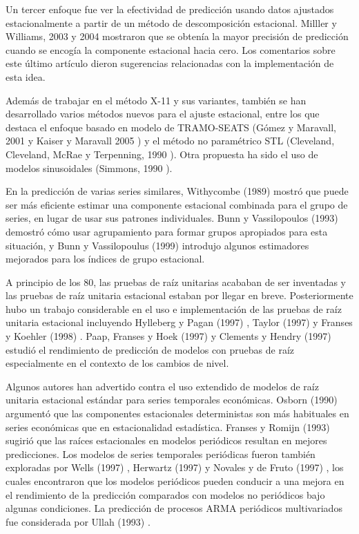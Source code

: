 \documentclass{llncs}
\begin{document}
Un tercer enfoque fue ver la efectividad de predicción usando datos ajustados estacionalmente a partir de un método de descomposición estacional. Milller y Williams, 2003 \cite{Miller2003669} y 2004 \cite{Miller2004529} mostraron que se obtenía la mayor precisión de predicción cuando se encogía la componente estacional hacia cero.  Los comentarios sobre este último artículo dieron sugerencias relacionadas con la implementación de esta idea.

Además de trabajar en el método X-11 y sus variantes, también se han desarrollado varios métodos nuevos para el ajuste estacional, entre los que destaca el enfoque basado en modelo de TRAMO-SEATS (Gómez y Maravall, 2001 \cite{Gómez2001} y Kaiser y Maravall 2005 \cite{Kaiser2005691}) y el método no paramétrico STL (Cleveland, Cleveland, McRae y Terpenning, 1990 \cite{Cleveland19903}). Otra propuesta ha sido el uso de modelos sinusoidales (Simmons, 1990 \cite{Simmons1990485}).

En la predicción de varias series similares, Withycombe (1989) \cite{Withycombe1989547} mostró que puede ser más eficiente estimar una componente estacional combinada para el grupo de series, en lugar de usar sus patrones individuales. Bunn y Vassilopoulos (1993) \cite{Bunn1993517} demostró cómo usar agrupamiento para formar grupos apropiados para esta situación, y Bunn y Vassilopoulus (1999)\cite{Bunn1999431} introdujo algunos estimadores mejorados para los índices de grupo estacional.

A principio de los 80, las pruebas de raíz unitarias acababan de ser inventadas y las pruebas de raíz unitaria estacional estaban por llegar en breve. Posteriormente hubo un trabajo considerable en el uso e implementación de las pruebas de raíz unitaria estacional incluyendo Hylleberg y Pagan (1997) \cite{Hylleberg1997329}, Taylor (1997)\cite{Taylor1997307} y Franses y Koehler (1998) \cite{Franses1998405}. Paap, Franses y Hoek (1997) \cite{Paap1997357} y Clements y Hendry (1997) \cite{Clements1997341} estudió el rendimiento de predicción de modelos con pruebas de raíz especialmente en el contexto de los cambios de nivel.

Algunos autores han advertido contra el uso extendido de modelos de raíz unitaria estacional estándar para series temporales económicas. Osborn (1990) \cite{Osborn1990327} argumentó que las componentes estacionales deterministas son más habituales en series económicas que en estacionalidad estadística. Franses y Romijn (1993) \cite{HansFranses1993467} sugirió que las raíces estacionales en modelos periódicos resultan en mejores predicciones. Los modelos de series temporales periódicas fueron también exploradas por Wells (1997) \cite{Wells1997407}, Herwartz (1997) \cite{Herwartz1997421} y Novales y de Fruto (1997) \cite{Novales1997393}, los cuales encontraron que los modelos periódicos pueden conducir a una mejora en el rendimiento de la predicción comparados con modelos no periódicos bajo algunas condiciones. La predicción de procesos ARMA periódicos multivariados fue considerada por Ullah (1993) \cite{Ula1993645}.
\end{document}

